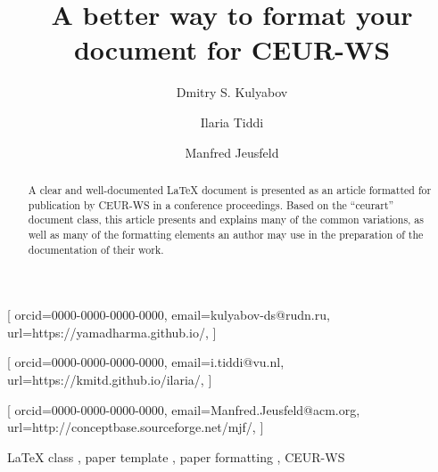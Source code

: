 \documentclass[%
hf
]{ceurart}
\begin{document}


\title{A better way to format your document for CEUR-WS}

\tnotemark[1]

\author[1,2]{Dmitry S. Kulyabov}[%
orcid=0000-0000-0000-0000,
email=kulyabov-ds@rudn.ru,
url=https://yamadharma.github.io/,
]
\cormark[1]
\fnmark[1]
\address[1]{RUDN University,
  6 Miklukho-Maklaya St, Moscow, 117198, Russian Federation}
\address[2]{Joint Institute for Nuclear Research,
  6 Joliot-Curie St, Dubna, 141980, Russian Federation}

\author[3]{Ilaria Tiddi}[%
orcid=0000-0000-0000-0000,
email=i.tiddi@vu.nl,
url=https://kmitd.github.io/ilaria/,
]
\fnmark[1]
\address[3]{Vrije Universiteit Amsterdam, De Boelelaan 1105, 1081 HV Amsterdam, The Netherlands}

\author[4]{Manfred Jeusfeld}[%
orcid=0000-0000-0000-0000,
email=Manfred.Jeusfeld@acm.org,
url=http://conceptbase.sourceforge.net/mjf/,
]
\fnmark[1]
\address[4]{University of Skövde, Högskolevägen 1, 541 28 Skövde, Sweden}


\begin{abstract}
  A clear and well-documented \LaTeX{} document is presented as an article formatted for publication by CEUR-WS in a conference proceedings.
  Based on the \enquote{ceurart} document class, this article presents and explains many of the common variations, as well as many of the formatting elements an author may use in the preparation of the documentation of their work.
\end{abstract}

\begin{keywords}
  LaTeX class \sep
  paper template \sep
  paper formatting \sep
  CEUR-WS
\end{keywords}
\end{document}
